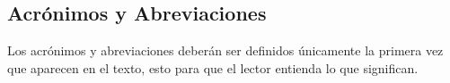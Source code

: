     
    
    \subsection{Acrónimos y Abreviaciones}
    
    Los acrónimos y abreviaciones deberán ser definidos únicamente la primera vez que aparecen en el texto, esto para que el lector entienda lo que significan.
    
